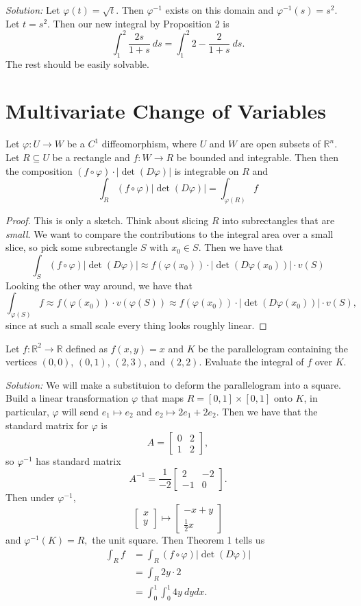 \documentclass[11pt]{article}
\theoremstyle{definition}
\newcommand{\R}{\mathbb{R}}                      %
\newcommand{\mat}{\begin{bmatrix}}
\newcommand{\trix}{\end{bmatrix}}
\begin{document}
\textit{Solution:} Let $\varphi(t)=\sqrt{t}$. Then $\varphi^{-1}$ exists on this domain and $\varphi^{-1}(s)=s^2$. Let $t=s^2$. Then our new integral by Proposition 2 is
$$
\int_1^2 \frac{2s}{1+s}~ds=\int_1^2 2-\frac{2}{1+s}~ds.
$$
The rest should be easily solvable.

\section{Multivariate Change of Variables}

\begin{shaded}
\theorem Let $\varphi:U\to W$ be a $C^1$ diffeomorphism, where $U$ and $W$ are open subsets of $\R^n$. Let $R\subseteq U$ be a rectangle and $f:W\to R$ be bounded and integrable. Then then the composition $(f\circ\varphi)\cdot |\det(D\varphi)|$ is integrable on $R$ and 
$$
\int_R (f\circ \varphi)|\det(D\varphi)| =\int_{\varphi(R)}f
$$
\end{shaded}
\begin{proof}
    This is only a sketch. Think about slicing $R$ into subrectangles that are \textit{small}. We want to compare the contributions to the integral area over a small slice, so pick some subrectangle $S$ with $x_0\in S$. Then we have that
    $$
    \int_S (f\circ\varphi)|\det(D\varphi)|\approx f(\varphi(x_0))\cdot|\det(D\varphi(x_0))|\cdot v(S)
    $$
    Looking the other way around, we have that
    $$
    \int_{\varphi(S)}f\approx f(\varphi(x_0))\cdot v(\varphi(S))\approx f(\varphi(x_0))\cdot |\det(D\varphi(x_0))|\cdot v(S),
    $$
    since at such a small scale every thing looks roughly linear.
\end{proof}

\ex Let $f:\R^2\to \R$ defined as $f(x,y)=x$ and $K$ be the parallelogram containing the vertices $(0,0)$, $(0,1)$, $(2,3)$, and $(2,2)$. Evaluate the integral of $f$ over $K$.

\textit{Solution:} We will make a substituion to deform the parallelogram into a square. Build a linear transformation $\varphi$ that maps $R=[0,1]\times [0,1]$ onto $K$, in particular, $\varphi$ will send $e_1\mapsto e_2$ and $e_2\mapsto 2e_1+2e_2$. Then we have that the standard matrix for $\varphi$ is
$$
A=\mat 0 & 2 \\ 1 & 2 \trix,
$$
so $\varphi^{-1}$ has standard matrix
$$
A^{-1} = \frac{1}{-2}\mat 2 & -2 \\ -1 & 0 \trix.
$$
Then under $\varphi^{-1}$,
$$
\mat x \\ y \trix \mapsto \mat -x + y \\ \frac{1}{2}x \trix
$$
and $\varphi^{-1}(K)=R,$ the unit square. Then Theorem 1 tells us
$$
\begin{aligned}
\int_R f &= \int_R (f\circ \varphi)|\det(D\varphi)|\\
&= \int_R 2y\cdot 2\\
&=\int_0^1 \int_0^1 4y ~dydx.
\end{aligned}
$$
\end{document}
